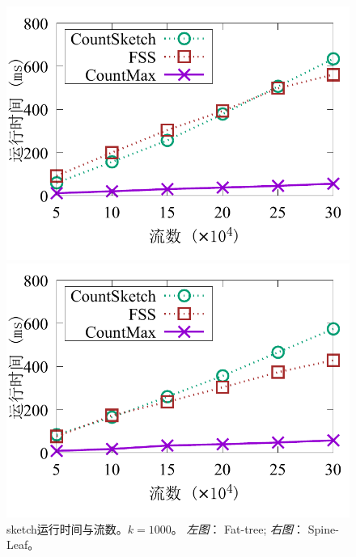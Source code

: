 \begin{figure}[ht]
	\centering
	\begin{minipage}[t]{0.49\linewidth}
		\centering
		\includegraphics[width=\linewidth]{fig/ft_flow_time_1000.pdf}
	\end{minipage}\vspace{-0.6em}%
	\begin{minipage}[t]{0.49\linewidth}
		\centering
		\includegraphics[width=\linewidth]{fig/hy_flow_time_1000.pdf}
	\end{minipage} \vspace{-0.6em}%
	\caption{\textnormal{sketch运行时间与流数。$k=1000$。 \textit{左图}： Fat-tree; \textit{右图}： Spine-Leaf。}}
	\label{fig:time,f}
\end{figure}


